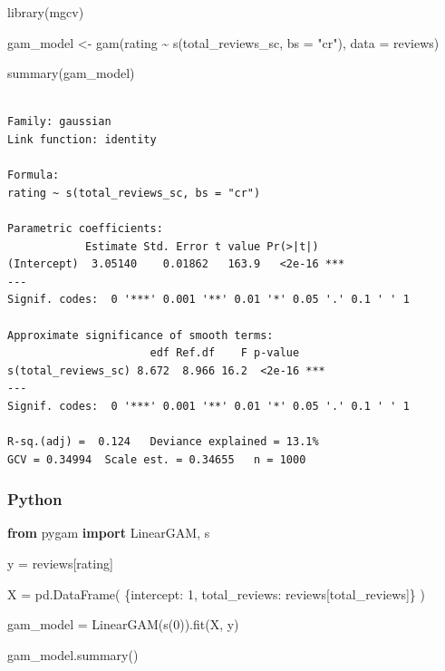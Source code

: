 \documentclass[
  letterpaper,
]{krantz}
\newenvironment{Shaded}{}{}
\newcommand{\AttributeTok}[1]{\textcolor[rgb]{0.49,0.56,0.16}{#1}}
\newcommand{\DecValTok}[1]{\textcolor[rgb]{0.25,0.63,0.44}{#1}}
\newcommand{\FunctionTok}[1]{\textcolor[rgb]{0.02,0.16,0.49}{#1}}
\newcommand{\ImportTok}[1]{\textcolor[rgb]{0.00,0.50,0.00}{\textbf{#1}}}
\newcommand{\NormalTok}[1]{#1}
\newcommand{\OperatorTok}[1]{\textcolor[rgb]{0.40,0.40,0.40}{#1}}
\newcommand{\OtherTok}[1]{\textcolor[rgb]{0.00,0.44,0.13}{#1}}
\newcommand{\SpecialCharTok}[1]{\textcolor[rgb]{0.25,0.44,0.63}{#1}}
\newcommand{\StringTok}[1]{\textcolor[rgb]{0.25,0.44,0.63}{#1}}
\begin{document}
\begin{Shaded}
\begin{Highlighting}[]
\FunctionTok{library}\NormalTok{(mgcv)}

\NormalTok{gam\_model }\OtherTok{\textless{}{-}} \FunctionTok{gam}\NormalTok{(rating }\SpecialCharTok{\textasciitilde{}} \FunctionTok{s}\NormalTok{(total\_reviews\_sc, }\AttributeTok{bs =} \StringTok{"cr"}\NormalTok{), }\AttributeTok{data =}\NormalTok{ reviews)}

\FunctionTok{summary}\NormalTok{(gam\_model)}
\end{Highlighting}
\end{Shaded}

\begin{verbatim}

Family: gaussian 
Link function: identity 

Formula:
rating ~ s(total_reviews_sc, bs = "cr")

Parametric coefficients:
            Estimate Std. Error t value Pr(>|t|)    
(Intercept)  3.05140    0.01862   163.9   <2e-16 ***
---
Signif. codes:  0 '***' 0.001 '**' 0.01 '*' 0.05 '.' 0.1 ' ' 1

Approximate significance of smooth terms:
                      edf Ref.df    F p-value    
s(total_reviews_sc) 8.672  8.966 16.2  <2e-16 ***
---
Signif. codes:  0 '***' 0.001 '**' 0.01 '*' 0.05 '.' 0.1 ' ' 1

R-sq.(adj) =  0.124   Deviance explained = 13.1%
GCV = 0.34994  Scale est. = 0.34655   n = 1000
\end{verbatim}

\subsubsection{Python}

\begin{Shaded}
\begin{Highlighting}[]
\ImportTok{from}\NormalTok{ pygam }\ImportTok{import}\NormalTok{ LinearGAM, s}

\NormalTok{y }\OperatorTok{=}\NormalTok{ reviews[}\StringTok{\textquotesingle{}rating\textquotesingle{}}\NormalTok{]}

\NormalTok{X }\OperatorTok{=}\NormalTok{ pd.DataFrame(}
\NormalTok{  \{}\StringTok{\textquotesingle{}intercept\textquotesingle{}}\NormalTok{: }\DecValTok{1}\NormalTok{, }
  \StringTok{\textquotesingle{}total\_reviews\textquotesingle{}}\NormalTok{: reviews[}\StringTok{\textquotesingle{}total\_reviews\textquotesingle{}}\NormalTok{]\}}
\NormalTok{)}

\NormalTok{gam\_model }\OperatorTok{=}\NormalTok{ LinearGAM(s(}\DecValTok{0}\NormalTok{)).fit(X, y)}

\NormalTok{gam\_model.summary()}
\end{Highlighting}
\end{Shaded}
\end{document}
